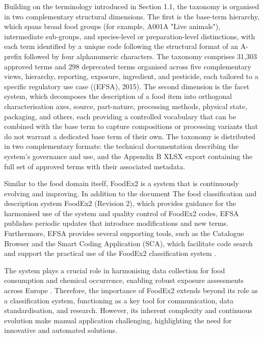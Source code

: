 Building on the terminology introduced in Section 1.1, the taxonomy is organised in two complementary structural dimensions. The first is the base-term hierarchy, which spans broad food groups (for example, A001A "Live animals"), intermediate sub-groups, and species-level or preparation-level distinctions, with each term identified by a unique code following the structural format of an A-prefix followed by four alphanumeric characters. The taxonomy comprises 31,303 approved terms and 298 deprecated terms organised across five complementary views, hierarchy, reporting, exposure, ingredient, and pesticide, each tailored to a specific regulatory use case ((EFSA), 2015). The second dimension is the facet system, which decomposes the description of a food item into orthogonal characterisation axes, source, part-nature, processing methods, physical state, packaging, and others, each providing a controlled vocabulary that can be combined with the base term to capture compositions or processing variants that do not warrant a dedicated base term of their own. The taxonomy is distributed in two complementary formats: the technical documentation describing the system's governance and use, and the Appendix B XLSX export containing the full set of approved terms with their associated metadata.

Similar to the food domain itself, FoodEx2 is a system that is continuously evolving and improving. In addition to the document The food classification and description system FoodEx2 (Revision 2), which provides guidance for the harmonised use of the system and quality control of FoodEx2 codes, EFSA publishes periodic updates that introduce modifications and new terms. Furthermore, EFSA provides several supporting tools, such as the Catalogue Browser and the Smart Coding Application (SCA), which facilitate code search and support the practical use of the FoodEx2 classification system \parencite{pedro_nabais_3f3d64d2,marina_nikoli__22bc7ee3}.

The system plays a crucial role in harmonising data collection for food consumption and chemical occurrence, enabling robust exposure assessments across Europe \parencite{marina_nikoli__c1230f7a,magalie_weber_debfa18b}. Therefore, the importance of FoodEx2 extends beyond its role as a classification system, functioning as a key tool for communication, data standardisation, and research. However, its inherent complexity and continuous evolution make manual application challenging, highlighting the need for innovative and automated solutions.

